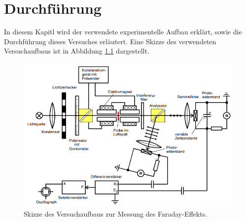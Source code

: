 \chapter{Durchführung}
\label{cha:Durchführung}
In diesem Kapitl wird der verwendete experimentelle Aufbau erklärt, sowie die Durchführung dieses Versuches erläutert. Eine Skizze des verwendeten Versuchaufbaus ist in Abbildung 
\ref{fig:skizze_aufbau} dargestellt.

\begin{figure}
              \centering
              \includegraphics[width = \textwidth]{content/aufbau_skizze.PNG}
              \caption{Skizze des Versuchaufbaus zur Messung des Faraday-Effekts. \cite{v47}}
              \label{fig:skizze_aufbau}
\end{figure}

